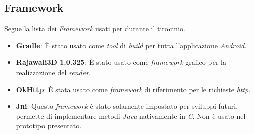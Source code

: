 \subsection{Framework}
Segue la lista dei \emph{Framework} usati per durante il tirocinio.
\begin{itemize}
	\item \textbf{Gradle}: È stato usato come \emph{tool} di \emph{build} per tutta l'applicazione \emph{Android}.
	\item \textbf{Rajawali3D 1.0.325}: È stato usato come \emph{framework} grafico per la realizzazione del \emph{render}.
	\item \textbf{OkHttp}: È stata usato come \emph{framework} di riferimento per le richieste \emph{http}.
	\item \textbf{Jni}: Questo \emph{framework} è stato solamente impostato per sviluppi futuri, permette di implementare metodi \emph{Java} nativamente in \emph{C}. Non è usato nel prototipo presentato.
\end{itemize}












